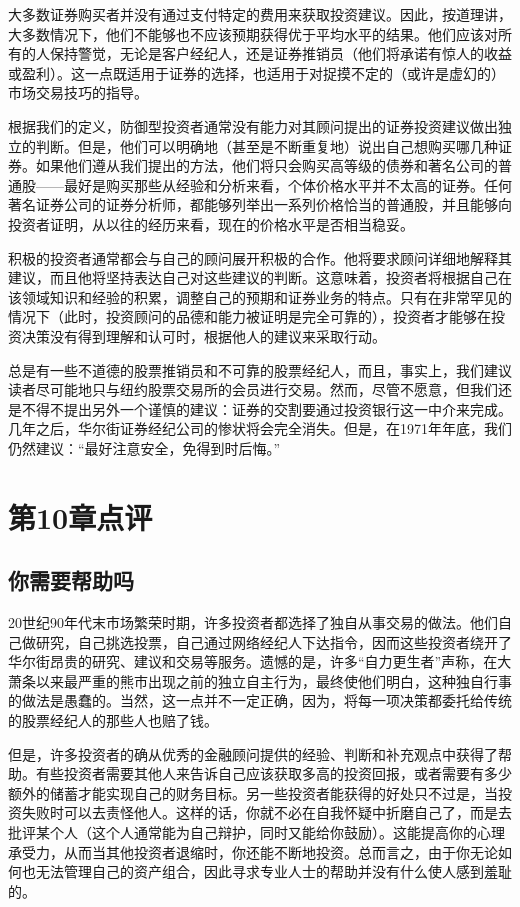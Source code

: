 \documentclass[12pt,oneside]{book}
\begin{document}
大多数证券购买者并没有通过支付特定的费用来获取投资建议。因此，按道理讲，大多数情况下，他们不能够也不应该预期获得优于平均水平的结果。他们应该对所有的人保持警觉，无论是客户经纪人，还是证券推销员（他们将承诺有惊人的收益或盈利）。这一点既适用于证券的选择，也适用于对捉摸不定的（或许是虚幻的）市场交易技巧的指导。

根据我们的定义，防御型投资者通常没有能力对其顾问提出的证券投资建议做出独立的判断。但是，他们可以明确地（甚至是不断重复地）说出自己想购买哪几种证券。如果他们遵从我们提出的方法，他们将只会购买高等级的债券和著名公司的普通股——最好是购买那些从经验和分析来看，个体价格水平并不太高的证券。任何著名证券公司的证券分析师，都能够列举出一系列价格恰当的普通股，并且能够向投资者证明，从以往的经历来看，现在的价格水平是否相当稳妥。

积极的投资者通常都会与自己的顾问展开积极的合作。他将要求顾问详细地解释其建议，而且他将坚持表达自己对这些建议的判断。这意味着，投资者将根据自己在该领域知识和经验的积累，调整自己的预期和证券业务的特点。只有在非常罕见的情况下（此时，投资顾问的品德和能力被证明是完全可靠的），投资者才能够在投资决策没有得到理解和认可时，根据他人的建议来采取行动。

总是有一些不道德的股票推销员和不可靠的股票经纪人，而且，事实上，我们建议读者尽可能地只与纽约股票交易所的会员进行交易。然而，尽管不愿意，但我们还是不得不提出另外一个谨慎的建议：证券的交割要通过投资银行这一中介来完成。几年之后，华尔街证券经纪公司的惨状将会完全消失。但是，在1971年年底，我们仍然建议：“最好注意安全，免得到时后悔。”


\section{第10章点评}
\subsection{你需要帮助吗}
20世纪90年代末市场繁荣时期，许多投资者都选择了独自从事交易的做法。他们自己做研究，自己挑选投票，自己通过网络经纪人下达指令，因而这些投资者绕开了华尔街昂贵的研究、建议和交易等服务。遗憾的是，许多“自力更生者”声称，在大萧条以来最严重的熊市出现之前的独立自主行为，最终使他们明白，这种独自行事的做法是愚蠢的。当然，这一点并不一定正确，因为，将每一项决策都委托给传统的股票经纪人的那些人也赔了钱。

但是，许多投资者的确从优秀的金融顾问提供的经验、判断和补充观点中获得了帮助。有些投资者需要其他人来告诉自己应该获取多高的投资回报，或者需要有多少额外的储蓄才能实现自己的财务目标。另一些投资者能获得的好处只不过是，当投资失败时可以去责怪他人。这样的话，你就不必在自我怀疑中折磨自己了，而是去批评某个人（这个人通常能为自己辩护，同时又能给你鼓励）。这能提高你的心理承受力，从而当其他投资者退缩时，你还能不断地投资。总而言之，由于你无论如何也无法管理自己的资产组合，因此寻求专业人士的帮助并没有什么使人感到羞耻的。
\end{document}
